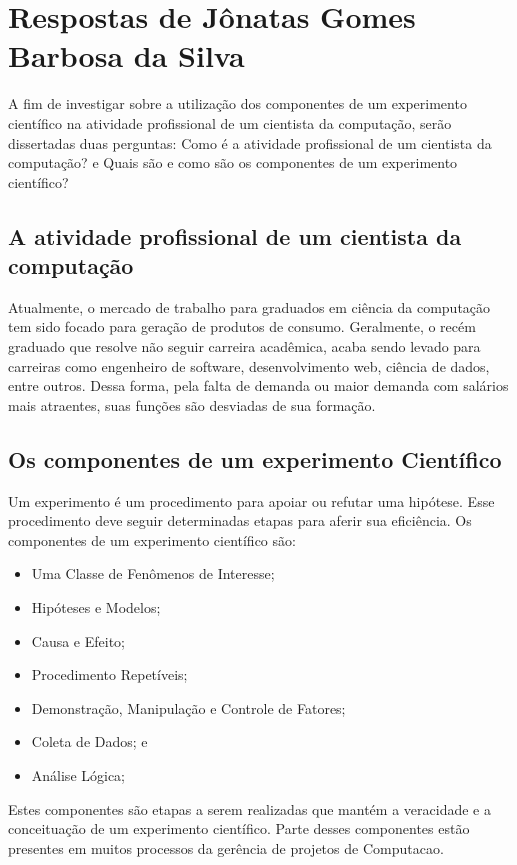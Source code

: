 \section{Respostas de Jônatas Gomes Barbosa da Silva}
A fim de investigar sobre a utilização dos componentes de um experimento científico na atividade profissional de um cientista da computação, serão dissertadas duas perguntas: Como é a atividade profissional de um cientista da computação? e Quais são e como são os componentes de um experimento científico?

\subsection{A atividade profissional de um cientista da computação}
Atualmente, o mercado de trabalho para graduados em ciência da computação tem sido focado para geração de produtos de consumo. Geralmente, o recém graduado que resolve não seguir carreira acadêmica, acaba sendo levado para carreiras como engenheiro de software, desenvolvimento web, ciência de dados, entre outros. Dessa forma, pela falta de demanda ou maior demanda com salários mais atraentes, suas funções são desviadas de sua formação. 

\subsection{Os componentes de um experimento Científico}
Um \gls{experimento} é um procedimento para apoiar ou refutar uma hipótese. Esse procedimento deve seguir determinadas etapas para aferir sua eficiência. Os componentes de um experimento científico são:
\begin{itemize}
    \item Uma Classe de Fenômenos de Interesse;
    \item Hipóteses e Modelos;
    \item Causa e Efeito;
    \item Procedimento Repetíveis;
    \item Demonstração, Manipulação e Controle de Fatores;
    \item Coleta de Dados; e
    \item Análise Lógica;
\end{itemize}

Estes componentes são etapas a serem realizadas que mantém a veracidade e a conceituação de um experimento científico. Parte desses componentes estão presentes em muitos processos da gerência de projetos de \gls{Computacao}.


